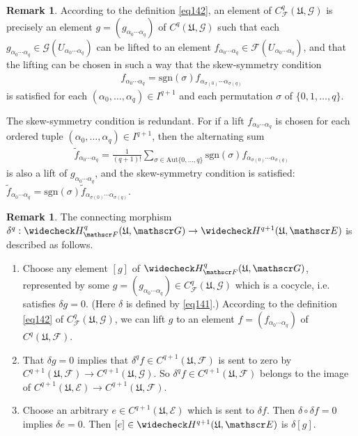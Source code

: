 \documentclass[12pt,b5paper,notitlepage]{report}
\theoremstyle{definition}
\newtheorem{rem}[df]{Remark}
\theoremstyle{plain}
\newcommand{\fk}{\mathfrak}
\newcommand{\wtd}{\widetilde}
\newcommand{\wch}{\widecheck}
\newcommand{\scr}{\mathscr}
\newcommand{\sgn}{\mathrm{sgn}}
\newcommand{\Aut}{\mathrm{Aut}}
\numberwithin{equation}{section}
\begin{document}
\begin{rem}\label{lb319}
According to the definition \eqref{eq142}, an element of $C_{\scr F}^q(\fk U,\scr G)$ is precisely an element $g=(g_{\alpha_0\cdots\alpha_q})$ of $C^q(\fk U,\scr G)$ such that each $g_{\alpha_0\cdots\alpha_q}\in \scr G(U_{\alpha_0\cdots\alpha_q})$ can be lifted to an element $f_{\alpha_0\cdots\alpha_q}\in \scr F(U_{\alpha_0\cdots\alpha_q})$, and that the lifting can be chosen in such a way that the skew-symmetry condition
\begin{align}
f_{\alpha_0\cdots\alpha_q}=\sgn(\sigma)f_{\alpha_{\sigma(0)}\cdots\alpha_{\sigma(q)}}
\end{align}
is satisfied for each $(\alpha_0,\dots,\alpha_q)\in I^{q+1}$ and each permutation $\sigma$ of $\{0,1,\dots,q\}$.

The skew-symmetry condition is redundant. For if a lift $f_{\alpha_0\cdots\alpha_q}$ is chosen for each ordered tuple $(\alpha_0,\dots,\alpha_q)\in I^{q+1}$, then the alternating sum
\begin{align*}
\wtd f_{\alpha_0\cdots\alpha_q}=\frac 1{(q+1)!}\sum_{\sigma\in \Aut\{0,\dots,q\}}\sgn(\sigma)f_{\alpha_{\sigma(0)}\cdots\alpha_{\sigma(q)}}
\end{align*}
is also a lift of $g_{\alpha_0\cdots\alpha_q}$, and the skew-symmetry condition is satisfied: $\wtd f_{\alpha_0\cdots\alpha_q}=\sgn(\sigma)\wtd f_{\alpha_{\sigma(0)}\cdots\alpha_{\sigma(q)}}$.   \hfill\qedsymbol
\end{rem}






\begin{rem}
The connecting morphism $\delta^q:\wch H^q_{\scr F}(\fk U,\scr G)\rightarrow \wch H^{q+1}(\fk U,\scr E)$ is described as follows. 
\begin{enumerate}
\item Choose any element $[g]$ of $\wch H^q_{\scr F}(\fk U,\scr G)$, represented by some $g=(g_{\alpha_0\cdots\alpha_q})\in C_{\scr F}^q(\fk U,\scr G)$ which is a cocycle, i.e. satisfies $\delta g=0$. (Here $\delta$ is defined by \eqref{eq141}.) According to the definition \eqref{eq142} of $C_{\scr F}^q(\fk U,\scr G)$, we can lift $g$ to an element $f=(f_{\alpha_0\cdots\alpha_q})$ of $C^q(\fk U,\scr F)$. 
\item That $\delta g=0$ implies that $\delta^qf\in C^{q+1}(\fk U,\scr F)$ is sent to zero by $C^{q+1}(\fk U,\scr F)\rightarrow C^{q+1}(\fk U,\scr G)$. So $\delta^qf\in C^{q+1}(\fk U,\scr F)$ belongs to the image of $C^{q+1}(\fk U,\scr E)\rightarrow C^{q+1}(\fk U,\scr F)$. 
\item Choose an arbitrary $e\in C^{q+1}(\fk U,\scr E)$ which is sent to $\delta f$. Then $\delta\circ\delta f=0$ implies $\delta e=0$. Then $[e]\in\wch H^{q+1}(\fk U,\scr E)$ is $\delta[g]$.
\end{enumerate}
\hfill\qedsymbol
\end{rem}
\end{document}
